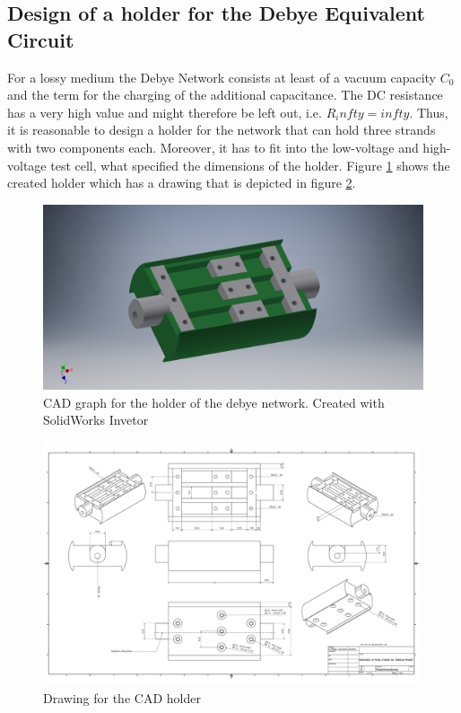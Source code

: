 \subsection{Design of a holder for the Debye Equivalent Circuit}
For a lossy medium the Debye Network consists at least of a vacuum capacity $C_0$ and the term for the charging of the additional capacitance. The DC resistance has a very high value and might therefore be left out, i.e. $R_infty=infty$. Thus, it is reasonable to design a holder for the network that can hold three strands with two components each. Moreover, it has to fit into the low-voltage and high-voltage test cell, what specified the dimensions of the holder.  
Figure \ref{fig.CADgraph} shows the created holder which has a drawing that is depicted in figure \ref{fig.CADdrawing}.

\begin{figure}[h!tb]
\includegraphics[width=\textwidth]{figures/Method/CAD_MODEL/Gesamtanordnung.jpg}
\caption{CAD graph for the holder of the debye network. Created with SolidWorks Invetor}
\label{fig.CADgraph}
\end{figure}
\newpage

\begin{figure}
\includegraphics[width=0.99\textwidth]{figures/Gesamtanordnung.pdf}
    \caption{Drawing for the CAD holder}
    \label{fig.CADdrawing}
   \end{figure}	
\newpage
    

